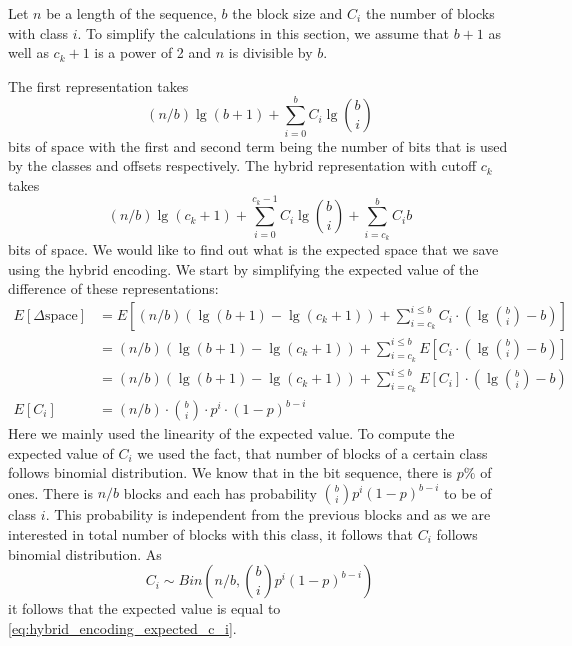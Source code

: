 Let $n$ be a length of the
sequence, $b$ the block size and $C_i$ the number of blocks with class $i$. To simplify the
calculations in this section, we assume that $b+1$ as well as $c_k+1$ is a power of 2 and
$n$ is divisible by $b$.

The first representation takes $$(n/b)\lg (b+1) + \sum_{i=0}^{b} C_i\lg {b\choose i}$$
bits of space with the first and second term being the number of bits that is used by the
classes and offsets respectively. The hybrid representation with cutoff $c_k$ takes
$$(n/b)\lg (c_k+1) + \sum_{i=0}^{c_k-1}C_i\lg {b\choose i} + \sum_{i=c_k}^{b}C_i b$$
bits of space. We would like to find out what is the expected space that we save using the
hybrid encoding. We start by simplifying the expected value of the difference of these
representations:
\begin{align}
E[\Delta\text{space}] &= E\left[(n/b)(\lg(b+1)-\lg(c_k+1)) + \sum_{i=c_k}^{i\leq b}C_i\cdot \left(\lg{b\choose i} - b\right)\right] \nonumber\\
&=(n/b)(\lg(b+1)-\lg(c_k+1)) + \sum_{i=c_k}^{i\leq b}E\left[C_i\cdot \left(\lg{b\choose i} - b\right)\right] \nonumber\\
&=(n/b)(\lg(b+1)-\lg(c_k+1)) + \sum_{i=c_k}^{i\leq b}E\left[C_i\right]\cdot \left(\lg{b\choose i} - b\right) \nonumber\\
E[C_i] &= (n/b)\cdot {b\choose i}\cdot p^i\cdot (1-p)^{b-i} \label{eq:hybrid_encoding_expected_c_i}
\end{align}
Here we mainly used the linearity of the expected value. To compute the expected value of
$C_i$ we used the fact, that number of blocks of a certain class follows binomial
distribution. We know that in the bit sequence, there is $p\%$ of ones. There is $n/b$ blocks
and each has probability ${b\choose i}p^i(1-p)^{b-i}$ to be of class $i$. This probability
is independent from the previous blocks and as we are interested in total number of blocks with
this class, it follows that $C_i$ follows binomial distribution. As
$$C_i \sim Bin\left(n/b, {b\choose i}p^i(1-p)^{b-i}\right)$$ it follows that the expected value
is equal to \ref{eq:hybrid_encoding_expected_c_i}.

